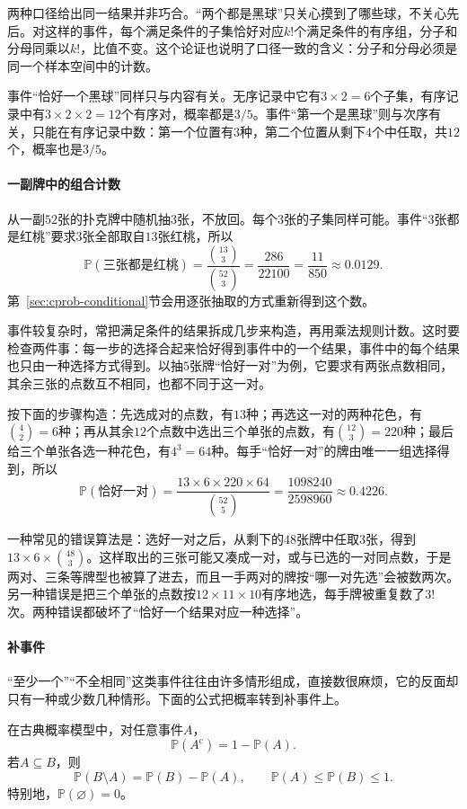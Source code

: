 两种口径给出同一结果并非巧合。“两个都是黑球”只关心摸到了哪些球，不关心先后。对这样的事件，每个满足条件的子集恰好对应$k!$个满足条件的有序组，分子和分母同乘以$k!$，比值不变。这个论证也说明了口径一致的含义：分子和分母必须是同一个样本空间中的计数。

事件“恰好一个黑球”同样只与内容有关。无序记录中它有$3\times2=6$个子集，有序记录中有$3\times2\times2=12$个有序对，概率都是$3/5$。事件“第一个是黑球”则与次序有关，只能在有序记录中数：第一个位置有$3$种，第二个位置从剩下$4$个中任取，共$12$个，概率也是$3/5$。

\paragraph{一副牌中的组合计数}
从一副$52$张的扑克牌中随机抽$3$张，不放回。每个$3$张的子集同样可能。事件“$3$张都是红桃”要求$3$张全部取自$13$张红桃，所以
\[
 \mathbb{P}(\text{三张都是红桃})=\frac{\binom{13}{3}}{\binom{52}{3}}
 =\frac{286}{22100}=\frac{11}{850}\approx0.0129.
\]
第~\ref{sec:cprob-conditional}节会用逐张抽取的方式重新得到这个数。

事件较复杂时，常把满足条件的结果拆成几步来构造，再用乘法规则计数。这时要检查两件事：每一步的选择合起来恰好得到事件中的一个结果，事件中的每个结果也只由一种选择方式得到。以抽$5$张牌“恰好一对”为例，它要求有两张点数相同，其余三张的点数互不相同，也都不同于这一对。

按下面的步骤构造：先选成对的点数，有$13$种；再选这一对的两种花色，有$\binom42=6$种；再从其余$12$个点数中选出三个单张的点数，有$\binom{12}{3}=220$种；最后给三个单张各选一种花色，有$4^{3}=64$种。每手“恰好一对”的牌由唯一一组选择得到，所以
\[
 \mathbb{P}(\text{恰好一对})=\frac{13\times6\times220\times64}{\binom{52}{5}}
 =\frac{1098240}{2598960}\approx0.4226.
\]

一种常见的错误算法是：选好一对之后，从剩下的$48$张牌中任取$3$张，得到$13\times6\times\binom{48}{3}$。这样取出的三张可能又凑成一对，或与已选的一对同点数，于是两对、三条等牌型也被算了进去，而且一手两对的牌按“哪一对先选”会被数两次。另一种错误是把三个单张的点数按$12\times11\times10$有序地选，每手牌被重复数了$3!$次。两种错误都破坏了“恰好一个结果对应一种选择”。

\paragraph{补事件}
“至少一个”“不全相同”这类事件往往由许多情形组成，直接数很麻烦，它的反面却只有一种或少数几种情形。下面的公式把概率转到补事件上。

\begin{theorem}[补事件与包含关系]
\label{thm:cprob-complement}
在古典概率模型中，对任意事件$A$，
\begin{equation}
 \mathbb{P}(A^{\mathrm{c}})=1-\mathbb{P}(A).
 \label{eq:cprob-complement}
\end{equation}
若$A\subseteq B$，则
\begin{equation}
 \mathbb{P}(B\setminus A)=\mathbb{P}(B)-\mathbb{P}(A),\qquad
 \mathbb{P}(A)\leq\mathbb{P}(B)\leq1.
 \label{eq:cprob-monotone}
\end{equation}
特别地，$\mathbb{P}(\varnothing)=0$。
\end{theorem}

